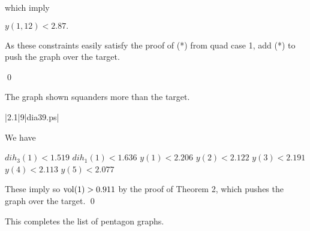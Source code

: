 which imply

$y(1,12)<2.87.$ \newline

As these constraints easily satisfy the proof of (*) from
quad case 1, add (*) to push the graph over the target.

\qed

\bigskip

 The graph shown 
squanders more than the target.  \endproclaim

\gram|2.1|9|dia39.ps|  %


We have 

$dih_3(1) < 1.519$ \newline
$dih_1(1) < 1.636$ \newline
$y(1)<2.206$ \newline
$y(2)<2.122$ \newline
$y(3)<2.191$ \newline
$y(4)<2.113$ \newline
$y(5)<2.077$ \newline

These imply 
so $\operatorname{vol}(1)>0.911$ by the proof of Theorem 2, which pushes the graph over the target. \qed

\bigskip

This completes the list of pentagon graphs.




\bye